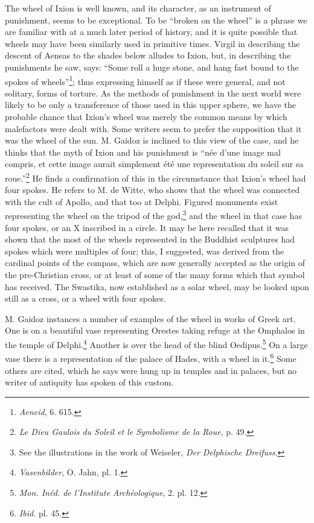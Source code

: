 \documentclass[a4paper, 11pt, oneside, polutonikogreek, english]{article}
\begin{document}
The wheel of Ixion is well known, and its character, as an instrument of punishment, seems to be exceptional. To be ``broken on the wheel'' is a phrase we are familiar with at a much later period of history, and it is quite possible that wheels may have been similarly used in primitive times. Virgil in describing the descent of Aeneas to the shades below alludes to Ixion, but, in describing the punishments he saw, says: ``Some roll a huge stone, and hang fast bound to the spokes of wheels''\footnote{\emph{Aeneid}, 6. 615.}; thus expressing himself as if these were general, and not solitary, forms of torture. As the methods of punishment in the next world were likely to be only a transference of those used in this upper sphere, we have the probable chance that Ixion's wheel was merely the common means by which malefactors were dealt with. Some writers seem to prefer the supposition that it was the wheel of the sun. M. Gaidoz is inclined to this view of the case, and he thinks that the myth of Ixion and his punishment is ``née d'une image mal compris, et cette image aurait simplement été une representation du soleil sur sa roue.''\footnote{\emph{Le Dieu Gaulois du Soleil et le Symbolisme de la Roue}, p. 49.} He finds a confirmation of this in the circumstance that Ixion's wheel had four spokes. He refers to M. de Witte, who shows that the wheel was connected with the cult of Apollo, and that too at Delphi. Figured monuments exist representing the wheel on the tripod of the god,\footnote{See the illustrations in the work of Weiseler, \emph{Der Delphische Dreifuss}.} and the wheel in that case has four spokes, or an X inscribed in a circle. It may be here recalled that it was shown that the most of the wheels represented in the Buddhist sculptures had spokes which were multiples of four; this, I suggested, was derived from the cardinal points of the compass, which are now generally accepted as the origin of the pre-Christian cross, or at least of some of the many forms which that symbol has received. The Swastika, now established as a solar wheel, may be looked upon still as a cross, or a wheel with four spokes.

M. Gaidoz instances a number of examples of the wheel in works of Greek art. One is on a beautiful vase representing Orestes taking refuge at the Omphalos in the temple of Delphi.\footnote{\emph{Vasenbilder}, O. Jahn, pl. 1.} Another is over the head of the blind Oedipus.\footnote{\emph{Mon. Inéd. de l'Institute Archéologique}, 2. pl. 12.} On a large vase there is a representation of the palace of Hades, with a wheel in it.\footnote{\emph{Ibid.} pl. 45.} Some others are cited, which he says were hung up in temples and in palaces, but no writer of antiquity has spoken of this custom.
\end{document}
